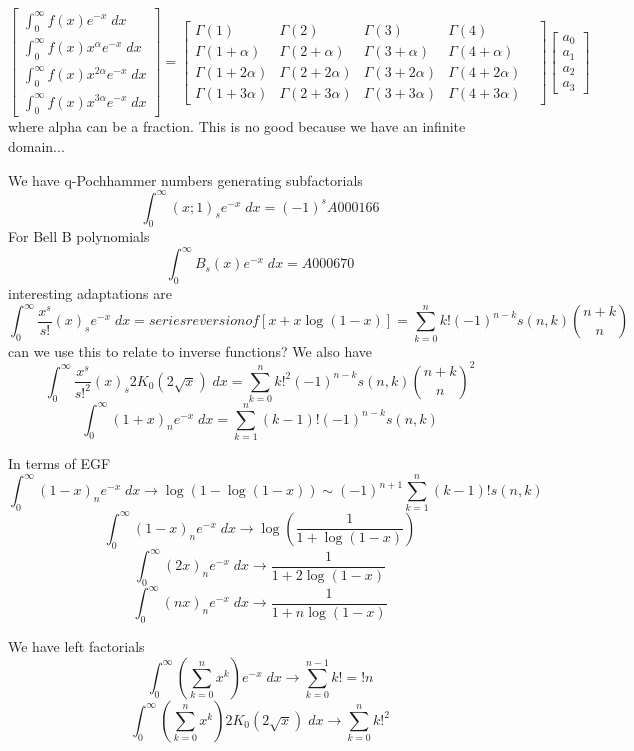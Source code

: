 \documentclass{article}
\begin{document}
\begin{equation}
\begin{bmatrix}
\int_0^\infty f(x) e^{-x} \; dx \\
\int_0^\infty f(x) x^{\alpha} e^{-x} \; dx \\
\int_0^\infty f(x) x^{2\alpha} e^{-x} \; dx \\
\int_0^\infty f(x) x^{3\alpha} e^{-x} \; dx
\end{bmatrix}
=
\begin{bmatrix}
\Gamma(1) & \Gamma(2) & \Gamma(3) & \Gamma(4) & \\
\Gamma(1 + \alpha) & \Gamma(2 + \alpha) & \Gamma(3 + \alpha) & \Gamma(4 + \alpha) & \\
\Gamma(1 + 2\alpha) & \Gamma(2 + 2\alpha) & \Gamma(3 + 2\alpha) & \Gamma(4 + 2\alpha) & \\
\Gamma(1 + 3\alpha) & \Gamma(2 + 3\alpha) & \Gamma(3 + 3\alpha) & \Gamma(4 + 3\alpha) & 
\end{bmatrix}
\begin{bmatrix}
a_0 \\ a_1 \\ a_2 \\ a_3
\end{bmatrix}
\end{equation}
where alpha can be a fraction. This is no good because we have an infinite domain... 

We have q-Pochhammer numbers generating subfactorials
$$
\int_0^\infty (x;1)_s e^{-x} \; dx = (-1)^s A000166
$$
For Bell B polynomials
$$
\int_0^\infty B_s(x) e^{-x} \; dx = A000670
$$
interesting adaptations are 
$$
\int_0^\infty \frac{x^s}{s!}(x)_s e^{-x} \; dx = series reversion of [x + x \log(1-x)] = \sum_{k=0}^n k! (-1)^{n-k} s(n,k) \binom{n+k}{n}
$$
can we use this to relate to inverse functions? We also have 
$$
\int_0^\infty \frac{x^s}{s!^2}(x)_s 2K_0(2\sqrt{x}) \; dx  = \sum_{k=0}^n k!^2 (-1)^{n-k} s(n,k) \binom{n+k}{n}^2
$$
$$
\int_0^\infty (1+x)_n e^{-x} \; dx = \sum_{k=1}^n (k-1)! (-1)^{n-k} s(n,k)
$$


In terms of EGF
$$
\int_0^\infty (1-x)_n e^{-x} \; dx \to \log(1-\log(1-x)) \sim (-1)^{n+1} \sum_{k=1}^n (k-1)! s(n,k)
$$
$$
\int_0^\infty (1-x)_n e^{-x} \; dx \to \log\left(\frac{1}{1+\log(1-x)}\right)
$$
$$
\int_0^\infty (2x)_n e^{-x} \; dx \to \frac{1}{1+2\log(1-x)}
$$
$$
\int_0^\infty (nx)_n e^{-x} \; dx \to \frac{1}{1+n\log(1-x)}
$$

We have left factorials
$$
\int_0^\infty \left(\sum_{k=0}^n x^k\right) e^{-x} \; dx \to \sum_{k=0}^{n-1} k! = !n
$$
$$
\int_0^\infty \left(\sum_{k=0}^n x^k\right) 2K_0(2 \sqrt{x}) \; dx \to \sum_{k=0}^n k!^2
$$
\end{document}
